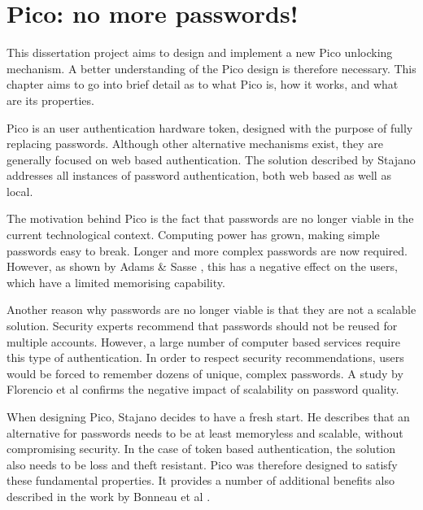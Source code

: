 
\chapter{Pico: no more passwords!} %

\label{Chapter2}


This dissertation project aims to design and implement a new Pico unlocking mechanism. A better understanding of the Pico design \cite{stajano2011pico} is therefore necessary. This chapter aims to go into brief detail as to what Pico is, how it works, and what are its properties.

Pico is an user authentication hardware token, designed with the purpose of fully replacing passwords. Although other alternative mechanisms exist, they are generally focused on web based authentication. The solution described by Stajano addresses all instances of password authentication, both web based as well as local.

The motivation behind Pico is the fact that passwords are no longer viable in the current technological context. Computing power has grown, making simple passwords easy to break. Longer and more complex passwords are now required. However, as shown by Adams \& Sasse \cite{adams1999users}, this has a negative effect on the users, which have a limited memorising capability.

Another reason why passwords are no longer viable is that they are not a scalable solution. Security experts recommend that passwords should not be reused for multiple accounts. However, a large number of computer based services require this type of authentication. In order to respect security recommendations, users would be forced to remember dozens of unique, complex passwords. A study by Florencio et al \cite{florencio2007large} confirms the negative impact of scalability on password quality.

When designing Pico, Stajano decides to have a fresh start. He describes that an alternative for passwords needs to be at least memoryless and scalable, without compromising security. In the case of token based authentication, the solution also needs to be loss and theft resistant. Pico was therefore designed to satisfy these fundamental properties. It provides a number of additional benefits also described in the work by Bonneau et al \cite{bonneau2012quest}.

